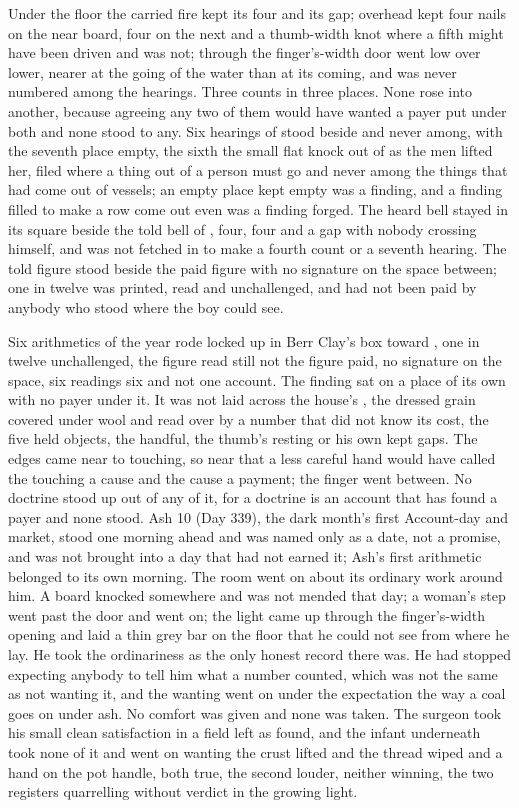 Under the floor the carried fire kept its four and its gap; overhead  kept four nails on the near board, four on the next and a thumb-width knot where a fifth might have been driven and was not; through the finger's-width door  went low over lower, nearer at the going of the water than at its coming, and was never numbered among the hearings. Three counts in three places. None rose into another, because agreeing any two of them would have wanted a payer put under both and none stood to any. Six hearings of  stood beside and never among, with the seventh place empty, the sixth the small flat knock out of  as the men lifted her, filed where a thing out of a person must go and never among the things that had come out of vessels; an empty place kept empty was a finding, and a finding filled to make a row come out even was a finding forged. The heard bell stayed in its square beside the told bell of , four, four and a gap with nobody crossing himself, and was not fetched in to make a fourth count or a seventh hearing. The told figure stood beside the paid figure with no signature on the space between; one in twelve was printed, read and unchallenged, and had not been paid by anybody who stood where the boy could see.

Six arithmetics of the year rode locked up  in Berr Clay's box toward , one in twelve unchallenged, the figure read still not the figure paid, no signature on the space, six readings six and not one account. The finding sat on a place of its own with no payer under it. It was not laid across the house's , the dressed grain covered under wool and read over by a number that did not know its cost, the five held objects, the handful, the thumb's resting or his own kept gaps. The edges came near to touching, so near that a less careful hand would have called the touching a cause and the cause a payment; the finger went between. No doctrine stood up out of any of it, for a doctrine is an account that has found a payer and none stood. Ash 10 (Day 339), the dark month's first Account-day and market, stood one morning ahead and was named only as a date, not a promise, and was not brought into a day that had not earned it; Ash's first arithmetic belonged to its own morning. The room went on about its ordinary work around him. A board knocked somewhere and was not mended that day; a woman's step went past the door and went on; the light came up through the finger's-width opening and laid a thin grey bar on the floor that he could not see from where he lay. He took the ordinariness as the only honest record there was. He had stopped expecting anybody to tell him what a number counted, which was not the same as not wanting it, and the wanting went on under the expectation the way a coal goes on under ash. No comfort was given and none was taken. The surgeon took his small clean satisfaction in a field left as found, and the infant underneath took none of it and went on wanting the crust lifted and the thread wiped and a hand on the pot handle, both true, the second louder, neither winning, the two registers quarrelling without verdict in the growing light.

